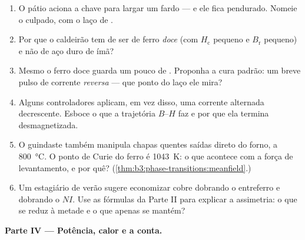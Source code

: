 \begin{problem}
\begin{enumerate}[resume]
  \item O pátio aciona a chave para largar um fardo --- e ele fica
        pendurado. Nomeie o culpado, com o laço de .
  \item Por que o caldeirão tem de ser de ferro \emph{doce} (com
        $H_{\text{c}}$ pequeno e $B_{\text{r}}$ pequeno) e não de aço
        duro de ímã?
  \item Mesmo o ferro doce guarda um pouco de . Proponha a
        cura padrão: um breve pulso de corrente \emph{reversa} ---
        que ponto do laço ele mira?
  \item Alguns controladores aplicam, em vez disso, uma corrente
        alternada decrescente. Esboce o que a trajetória $B$--$H$ faz e por que
        ela termina desmagnetizada.
  \item O guindaste também manipula chapas quentes saídas direto do forno,
        a \qty{800}{\celsius}. O ponto de Curie do ferro é
        \qty{1043}{K}: o que acontece com a força de levantamento, e por quê?
        (\cref{thm:b3:phase-transitions:meanfield}.)
  \item Um estagiário de verão sugere economizar cobre dobrando
        o entreferro e dobrando o $NI$. Use as fórmulas da Parte II para
        explicar a assimetria: o que se reduz à metade e o que apenas
        se mantém?
\end{enumerate}

\medskip\noindent\textbf{Parte IV --- Potência, calor e a conta.}


\end{problem}
